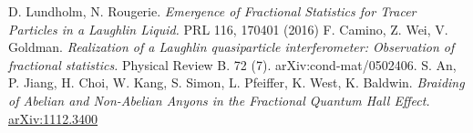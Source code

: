 \documentclass[a4paper,10pt,oneside]{book}
\theoremstyle{plain}
\theoremstyle{definition}
\theoremstyle{remark}
\begin{document}
\begin{thebibliography}{99}
   D. Lundholm, N. Rougerie. \textit{Emergence of Fractional Statistics for Tracer Particles in a Laughlin Liquid.} PRL 116, 170401 (2016)
   F. Camino, Z. Wei, V. Goldman. \textit{Realization of a Laughlin quasiparticle interferometer: Observation of fractional statistics.} Physical Review B. 72 (7). arXiv:cond-mat/0502406.
   S. An, P. Jiang, H. Choi, W. Kang, S. Simon, L. Pfeiffer, K. West, K. Baldwin. \textit{Braiding of Abelian and Non-Abelian Anyons in the Fractional Quantum Hall Effect.} \href{https://arxiv.org/abs/1112.3400}{arXiv:1112.3400}

\end{thebibliography}
\end{document}
